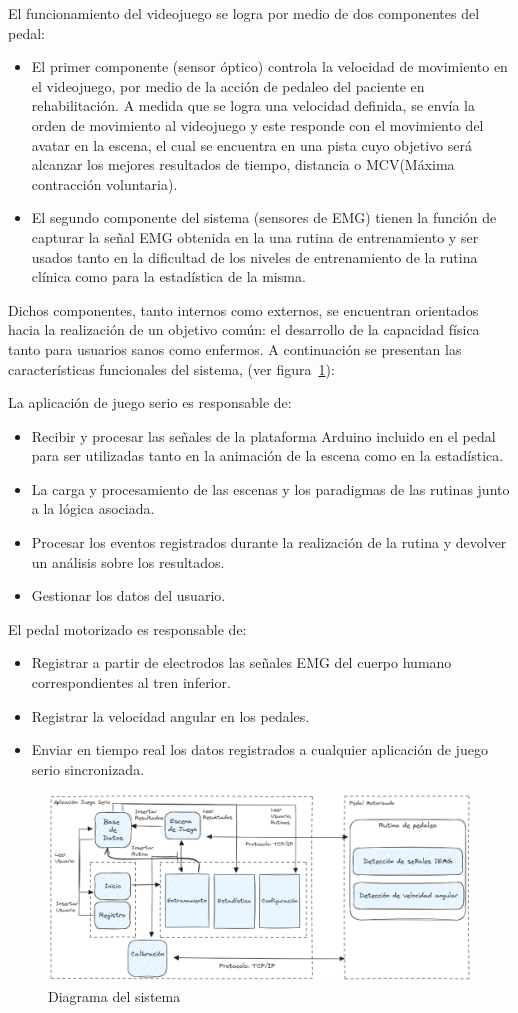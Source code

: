 El funcionamiento del videojuego se logra por medio de dos componentes del pedal:
\begin{itemize}
    \item El primer componente (sensor óptico) controla la velocidad de movimiento en el videojuego, por  medio de la acción de pedaleo del paciente en rehabilitación. A medida que se logra una velocidad definida, se envía la orden de movimiento al videojuego y este responde con el movimiento del avatar en la escena, el cual se encuentra en una pista cuyo objetivo será alcanzar los mejores resultados de tiempo, distancia o  MCV(Máxima contracción voluntaria).
    \item El segundo componente del sistema (sensores de EMG) tienen la función de capturar la señal EMG obtenida en la una rutina de entrenamiento y ser usados tanto en la dificultad de los niveles de entrenamiento de la rutina clínica como para la estadística de la misma.
\end{itemize}
    
Dichos componentes, tanto internos como externos, se encuentran orientados hacia  la realización de un objetivo común: el desarrollo de la capacidad física tanto para usuarios sanos como enfermos. A continuación se presentan las características funcionales del sistema, (ver figura~\ref{fig: system}):

La aplicación de juego serio es responsable de:
\begin{itemize}
    \item Recibir y procesar las señales de la plataforma Arduino incluido en el pedal para ser utilizadas tanto en la animación de la escena como en la estadística.
    \item La carga y procesamiento de las escenas y los paradigmas de las rutinas junto a la lógica asociada. 
    \item Procesar los eventos registrados durante la realización de la rutina y devolver un análisis sobre los resultados.
    \item Gestionar los datos del usuario.
\end{itemize}

El pedal motorizado es responsable de:
\begin{itemize}
    \item Registrar a partir de electrodos las señales EMG del cuerpo humano correspondientes al tren inferior.
    \item Registrar la velocidad angular en los pedales.
    \item Enviar en tiempo real los datos registrados a cualquier aplicación de juego serio sincronizada.
\end{itemize}
    
\begin{figure}[ht]
    \centering
    \includegraphics[scale=0.3]{images/system.png}
    \caption{Diagrama del sistema}
    \label{fig: system}
\end{figure}